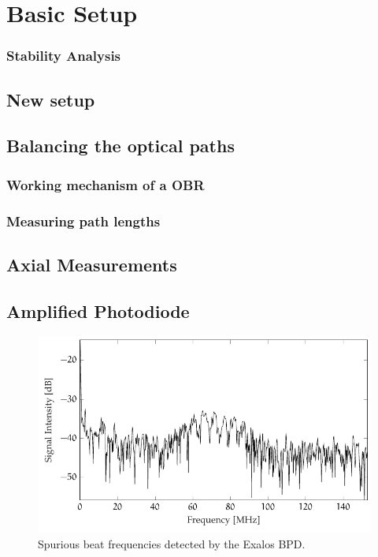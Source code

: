\section{Basic Setup}






\subsubsection{Stability Analysis}


\subsection{New setup}

\subsection{Balancing the optical paths}

\subsubsection{Working mechanism of a OBR}

\subsubsection{Measuring path lengths}




\subsection{Axial Measurements}


\subsection{Amplified Photodiode}

\begin{figure}[hbt]
\myfloatalign
\includegraphics[width=\linewidth]{gfx/tikz/axsun/spurious-frequencies}
\caption{Spurious beat frequencies detected by the Exalos \ac{BPD}.}\label{fig:spurious-frequencies}
\end{figure}%


